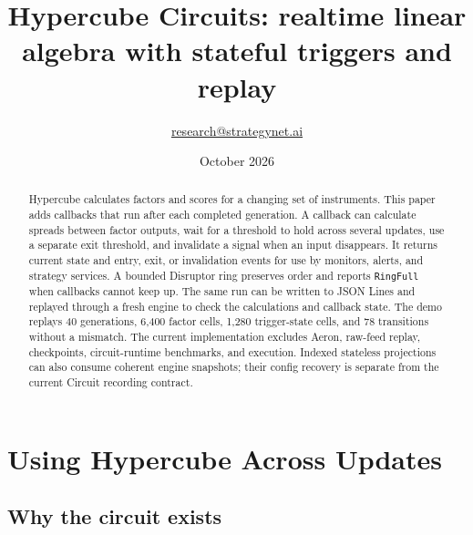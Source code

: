 \documentclass{strategynet-journal}
\title{Hypercube Circuits: realtime linear algebra with stateful triggers and replay}
\author{\href{mailto:research@strategynet.ai}{research@strategynet.ai}}
\date{October 2026}
\begin{document}
\maketitle

\begin{abstract}Hypercube calculates factors and scores for a changing set of 
  instruments. This paper adds callbacks that run after each completed generation. 
  A callback can calculate spreads between factor outputs, wait for a threshold 
  to hold across several updates, use a separate exit threshold, and invalidate 
  a signal when an input disappears. It returns current state and entry, 
  exit, or invalidation events for use by monitors, alerts, and strategy services. 
  A bounded Disruptor ring preserves order and reports \texttt{RingFull} 
  when callbacks cannot keep up. The same run can be written to JSON Lines and 
  replayed through a fresh engine to check the calculations and callback state. 
  The demo replays 40 generations, 6,400 factor cells, 1,280 trigger-state cells, 
  and 78 transitions without a mismatch. The current implementation excludes Aeron,
  raw-feed replay, checkpoints, circuit-runtime benchmarks, and execution.
  Indexed stateless projections can also consume coherent engine snapshots;
  their config recovery is separate from the current Circuit recording contract.
\end{abstract}

\SNtwocolumntableofcontents

\section{Using Hypercube Across Updates}

\subsection{Why the circuit exists}
\end{document}

